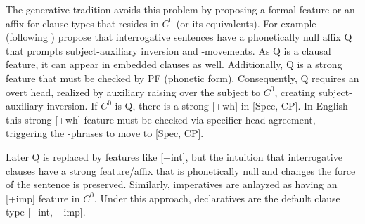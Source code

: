 The generative tradition avoids this problem by proposing a formal feature or an affix for clause types that resides in $C^{0}$ (or its equivalents). For example \textcite{chomsky1995minimalist} (following \textcite{katzpostal1964, baker1970int}) propose that interrogative sentences have a phonetically null affix Q that prompts subject-auxiliary inversion and \twh-movements. As Q is a clausal feature, it can appear in embedded clauses as well.  Additionally, Q is a strong feature that must be checked by PF (phonetic form). Consequently, Q requires an overt head, realized by auxiliary raising over the subject to $C^{0}$, creating subject-auxiliary inversion. If $C^{0}$ is Q, there is a strong [+wh] in [Spec, CP]. In English this strong [+wh] feature must be checked via specifier-head agreement, triggering the \twh-phrases to move to [Spec, CP]. 

Later Q is replaced by features like [+int], but the intuition that interrogative clauses have a strong feature/affix that is phonetically null and changes the force of the sentence is preserved. Similarly, imperatives are anlayzed as having an [+imp] feature in $C^{0}$. Under this approach, declaratives are the default clause type [$-$int, $-$imp]. 

